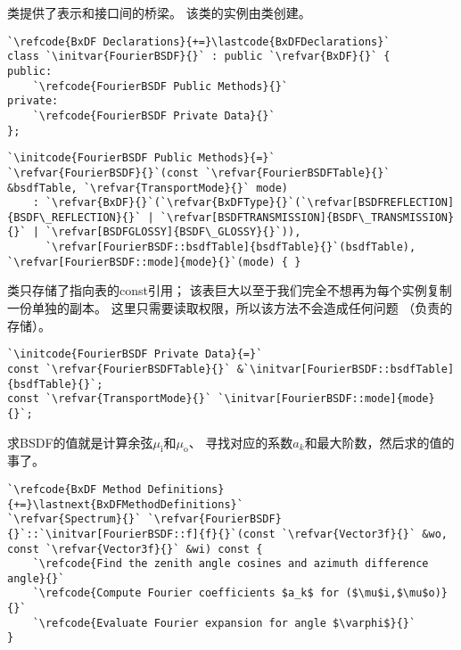 类提供了表示和接口间的桥梁。
该类的实例由类创建。
\begin{lstlisting}
`\refcode{BxDF Declarations}{+=}\lastcode{BxDFDeclarations}`
class `\initvar{FourierBSDF}{}` : public `\refvar{BxDF}{}` {
public:
    `\refcode{FourierBSDF Public Methods}{}`
private:
    `\refcode{FourierBSDF Private Data}{}`
};
\end{lstlisting}
\begin{lstlisting}
`\initcode{FourierBSDF Public Methods}{=}`
`\refvar{FourierBSDF}{}`(const `\refvar{FourierBSDFTable}{}` &bsdfTable, `\refvar{TransportMode}{}` mode)
    : `\refvar{BxDF}{}`(`\refvar{BxDFType}{}`(`\refvar[BSDFREFLECTION]{BSDF\_REFLECTION}{}` | `\refvar[BSDFTRANSMISSION]{BSDF\_TRANSMISSION}{}` | `\refvar[BSDFGLOSSY]{BSDF\_GLOSSY}{}`)),
      `\refvar[FourierBSDF::bsdfTable]{bsdfTable}{}`(bsdfTable), `\refvar[FourierBSDF::mode]{mode}{}`(mode) { }
\end{lstlisting}

类只存储了指向表的{\ttfamily const}引用；
该表巨大以至于我们完全不想再为每个实例复制一份单独的副本。
这里只需要读取权限，所以该方法不会造成任何问题
（负责的存储）。
\begin{lstlisting}
`\initcode{FourierBSDF Private Data}{=}`
const `\refvar{FourierBSDFTable}{}` &`\initvar[FourierBSDF::bsdfTable]{bsdfTable}{}`;
const `\refvar{TransportMode}{}` `\initvar[FourierBSDF::mode]{mode}{}`;
\end{lstlisting}

求BSDF的值就是计算余弦$\mu_{\mathrm{i}}$和$\mu_{\mathrm{o}}$、
寻找对应的系数$a_k$和最大阶数，然后求的值的事了。
\begin{lstlisting}
`\refcode{BxDF Method Definitions}{+=}\lastnext{BxDFMethodDefinitions}`
`\refvar{Spectrum}{}` `\refvar{FourierBSDF}{}`::`\initvar[FourierBSDF::f]{f}{}`(const `\refvar{Vector3f}{}` &wo, const `\refvar{Vector3f}{}` &wi) const { 
    `\refcode{Find the zenith angle cosines and azimuth difference angle}{}`
    `\refcode{Compute Fourier coefficients $a_k$ for ($\mu$i,$\mu$o)}{}`
    `\refcode{Evaluate Fourier expansion for angle $\varphi$}{}`
}
\end{lstlisting}

